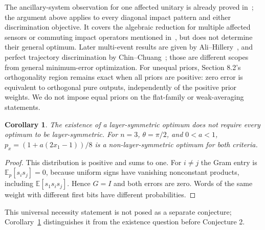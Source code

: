 \documentclass[11pt]{article}
\newtheorem{corollary}[theorem]{Corollary}
\begin{document}
The ancillary-system observation for one affected unitary is already
proved in~\cite[Appendix A]{SLHCM24}; the argument above applies
to every diagonal impact pattern and either discrimination objective.
It covers the algebraic reduction for multiple affected sensors or
commuting impact operators mentioned in~\cite[Section 9]{ZGH}, but
does not determine their general optimum. Later multi-event results
are given by Ali--Hillery~\cite{AH}, and perfect trajectory discrimination
by Chin--Chuang~\cite[Theorem 8(b)]{CC}; those are different scopes
from general minimum-error optimization. For unequal priors, Section 8.2's
orthogonality region remains exact when all priors are positive:
zero error is equivalent to orthogonal pure outputs, independently of
the positive prior weights. We do not impose equal priors on the flat-family
or weak-averaging statements.

\begin{corollary}\label{cor:necessity}
The existence of a layer-symmetric optimum does not require every optimum
to be layer-symmetric. For $n=3$, $\theta=\pi/2$, and $0<a<1$,
$p_x=(1+a(2x_1-1))/8$ is a non-layer-symmetric optimum for both criteria.
\end{corollary}
\begin{proof}
This distribution is positive and sums to one. For $i\ne j$ the Gram
entry is $\mathbb E_p[s_i s_j]=0$, because uniform signs have vanishing
nonconstant products, including $\mathbb E[s_1s_i s_j]$.
Hence $G=I$ and both errors are zero. Words of the same weight with
different first bits have different probabilities.
\end{proof}
This universal necessity statement is not posed as a separate conjecture;
Corollary~\ref{cor:necessity} distinguishes it from the existence
question before Conjecture 2.
\end{document}
